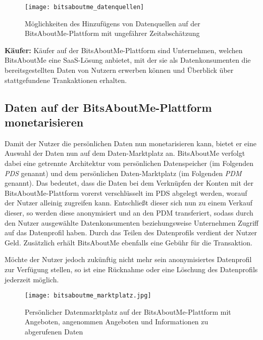 \begin{figure}[!htbp]
	\centering
	\texttt{[image: bitsaboutme\_datenquellen]}
	\caption{Möglichkeiten des Hinzufügens von Datenquellen auf der BitsAboutMe-Plattform mit ungefährer Zeitabschätzung}
	\label{fig:bitsaboutmeDatenquellen}
\end{figure}
\FloatBarrier

\noindent \textbf{Käufer:} Käufer auf der BitsAboutMe-Plattform sind Unternehmen, welchen BitsAboutMe eine SaaS-Lösung anbietet, mit der sie als Datenkonsumenten die bereitsgestellten Daten von Nutzern erwerben können und Überblick über stattgefundene Trankaktionen erhalten.

\subsection{Daten auf der BitsAboutMe-Plattform monetarisieren}
Damit der Nutzer die persönlichen Daten nun monetarisieren kann, bietet er eine Auswahl der Daten nun auf dem Daten-Marktplatz an. BitsAboutMe verfolgt dabei eine getrennte Architektur vom persönlichen Datenspeicher (im Folgenden \textit{PDS} genannt) und dem persönlichen Daten-Marktplatz (im Folgenden \textit{PDM} genannt). Das bedeutet, dass die Daten bei dem Verknüpfen der Konten mit der BitsAboutMe-Plattform vorerst verschlüsselt im PDS abgelegt werden, worauf der Nutzer alleinig zugreifen kann. Entschließt dieser sich nun zu einem Verkauf dieser, so werden diese anonymisiert und an den PDM transferiert, sodass durch den Nutzer ausgewählte Datenkonsumenten beziehungsweise Unternehmen Zugriff auf das Datenprofil haben. Durch das Teilen des Datenprofils verdient der Nutzer Geld. Zusätzlich erhält BitsAboutMe ebenfalls eine Gebühr für die Transaktion.\newline

\noindent Möchte der Nutzer jedoch zukünftig nicht mehr sein anonymisiertes Datenprofil zur Verfügung stellen, so ist eine Rücknahme oder eine Löschung des Datenprofils jederzeit möglich. \newline

\begin{figure}[h!]
	\centering
	\texttt{[image: bitsaboutme\_marktplatz.jpg]}
	\caption{Persönlicher Datenmarktplatz auf der BitsAboutMe-Plattform mit Angeboten, angenommen Angeboten und Informationen zu abgerufenen Daten}
	\label{fig:bitsaboutmeMarktplatz}
\end{figure}
\FloatBarrier


